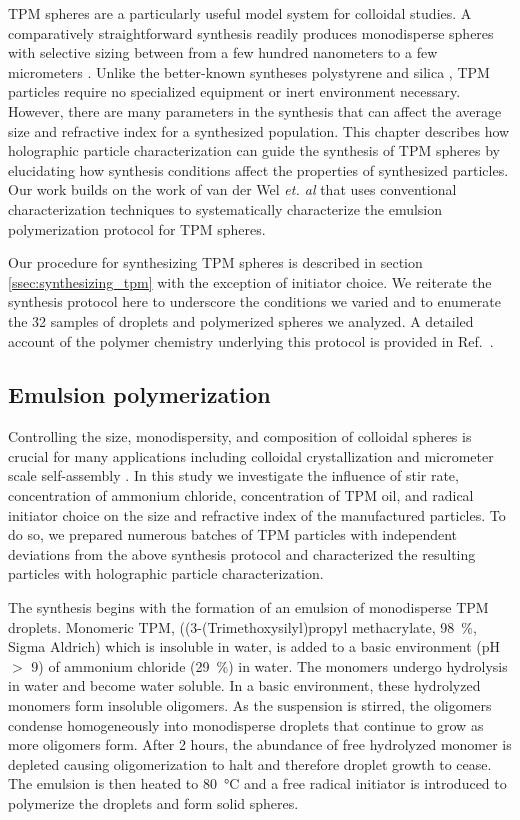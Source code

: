 TPM spheres are a particularly useful model system for colloidal studies.
A comparatively straightforward synthesis readily produces monodisperse spheres
with selective sizing between from a few hundred nanometers to a few micrometers
\cite{liu16}.
Unlike the better-known syntheses polystyrene \cite{goodwin1974} and silica \cite{stober68},
TPM particles require no specialized equipment or inert environment necessary.
However, there are many parameters in the synthesis that can affect the average size and refractive
index for a synthesized population. This chapter describes how holographic particle
characterization can guide the synthesis of TPM spheres by elucidating how
synthesis conditions affect the properties of synthesized particles.
Our work builds on the work of van der Wel \emph{et. al} \cite{vanderwel17} that
uses conventional characterization techniques to systematically
characterize the emulsion polymerization protocol for TPM spheres.

Our procedure for synthesizing TPM spheres is described in section
\ref{ssec:synthesizing_tpm} with the
exception of initiator choice. We reiterate the synthesis protocol
here to underscore the conditions we varied and to enumerate the
\num{32} samples of droplets and polymerized spheres we analyzed.
A detailed account of the polymer chemistry underlying this
protocol is provided in Ref.~\cite{vanderwel17}.

\subsection{Emulsion polymerization}
\label{ssec:polymerization}
Controlling the size, monodispersity, and composition of colloidal spheres is crucial
for many applications including colloidal crystallization \cite{pusey87} and micrometer scale
self-assembly \cite{sacanna11}. In this study 
we investigate the influence of stir rate, concentration of ammonium chloride,
concentration of TPM oil, and radical initiator choice on the size and refractive index
of the manufactured particles. To do so, we prepared numerous batches of TPM particles
with independent deviations from the above synthesis protocol and
characterized the resulting particles with holographic particle characterization.

The synthesis begins with the formation of an emulsion of monodisperse TPM droplets.
Monomeric TPM, ((3-(Trimethoxysilyl)propyl methacrylate, \SI{98}{\percent}, Sigma Aldrich)
which is insoluble in water, is added to a basic environment
(pH $>$ \num{9}) of ammonium chloride (\SI{29}{\percent}) in water.
The monomers undergo hydrolysis in water and become water soluble. 
In a basic environment, these hydrolyzed monomers form insoluble 
oligomers. As the suspension is stirred, the oligomers condense 
homogeneously into monodisperse droplets that continue to grow as more oligomers form.
After \num{2} hours, the abundance of free hydrolyzed monomer is depleted
causing oligomerization to halt and therefore droplet growth to cease.
The emulsion is then heated to \SI{80}{\degreeCelsius} and a free radical 
initiator is introduced to polymerize the droplets and form solid spheres.

